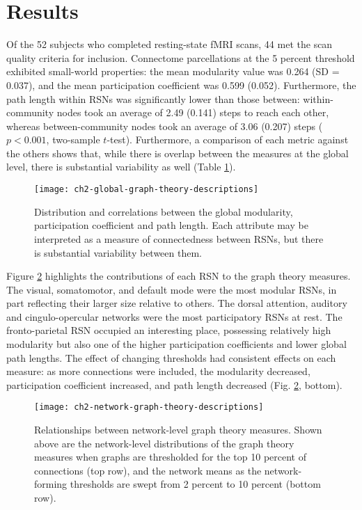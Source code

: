 \section{Results} 

Of the 52 subjects who completed resting-state fMRI scans, 44 met the scan quality criteria for inclusion. Connectome parcellations at the 5 percent threshold exhibited small-world properties: the mean modularity value was 0.264 (SD = 0.037), and the mean participation coefficient was 0.599 (0.052). Furthermore, the path length within RSNs was significantly lower than those between: within-community nodes took an average of 2.49 (0.141) steps to reach each other, whereas between-community nodes took an average of 3.06 (0.207) steps ($p < 0.001$, two-sample $t$-test). Furthermore, a comparison of each metric against the others shows that, while there is overlap between the measures at the global level, there is substantial variability as well (Table \ref{fig:ch2-global-graph-theory-descriptions}).

\begin{figure}[t]
    \centering
    \texttt{[image: ch2-global-graph-theory-descriptions]}
    \caption[Distribution and correlations between global graph theory measures]{Distribution and correlations between the global modularity, participation coefficient and path length. Each attribute may be interpreted as a measure of connectedness between RSNs, but there is substantial variability between them.}
    \label{fig:ch2-global-graph-theory-descriptions}
\end{figure}

Figure \ref{fig:ch2-network-graph-theory-descriptions} highlights the contributions of each RSN to the graph theory measures. The visual, somatomotor, and default mode were the most modular RSNs, in part reflecting their larger size relative to others. The dorsal attention, auditory and cingulo-opercular networks were the most participatory RSNs at rest. The fronto-parietal RSN occupied an interesting place, possessing relatively high modularity but also one of the higher participation coefficients and lower global path lengths. The effect of changing thresholds had consistent effects on each measure: as more connections were included, the modularity decreased, participation coefficient increased, and path length decreased (Fig. \ref{fig:ch2-network-graph-theory-descriptions}, bottom). 

\begin{figure}[t]
    \centering
    \texttt{[image: ch2-network-graph-theory-descriptions]}
    \caption[Relationships between network-level graph theory measures]{Relationships between network-level graph theory measures. Shown above are the network-level distributions of the graph theory measures when graphs are thresholded for the top 10 percent of connections (top row), and the network means as the network-forming thresholds are swept from 2 percent to 10 percent (bottom row).}
    \label{fig:ch2-network-graph-theory-descriptions}
\end{figure}

